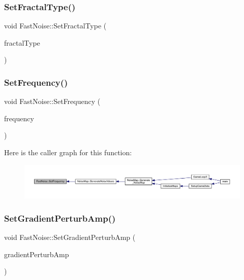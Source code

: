 \subsubsection{\texorpdfstring{Set\+Fractal\+Type()}{SetFractalType()}}
{\footnotesize\ttfamily void Fast\+Noise\+::\+Set\+Fractal\+Type (\begin{DoxyParamCaption}\item[{\mbox{\hyperlink{class_fast_noise_a20a2d45a468fa10a7c6a94e22c2f3d30}{Fractal\+Type}}}]{fractal\+Type }\end{DoxyParamCaption})\hspace{0.3cm}{\ttfamily [inline]}}

\mbox{\label{class_fast_noise_a4a16af07f18788c25e7515a9e1d2c53c}} 
\subsubsection{\texorpdfstring{Set\+Frequency()}{SetFrequency()}}
{\footnotesize\ttfamily void Fast\+Noise\+::\+Set\+Frequency (\begin{DoxyParamCaption}\item[{\mbox{\hyperlink{_fast_noise_8h_a75a9ef6d2541c4921815b885bfd449c3}{F\+N\+\_\+\+D\+E\+C\+I\+M\+AL}}}]{frequency }\end{DoxyParamCaption})\hspace{0.3cm}{\ttfamily [inline]}}

Here is the caller graph for this function\+:
\nopagebreak
\begin{figure}[H]
\begin{center}
\leavevmode
\includegraphics[width=350pt]{class_fast_noise_a4a16af07f18788c25e7515a9e1d2c53c_icgraph}
\end{center}
\end{figure}
\mbox{\label{class_fast_noise_a3b64dacf76e2a0f61769d51c73e9fdb3}} 
\subsubsection{\texorpdfstring{Set\+Gradient\+Perturb\+Amp()}{SetGradientPerturbAmp()}}
{\footnotesize\ttfamily void Fast\+Noise\+::\+Set\+Gradient\+Perturb\+Amp (\begin{DoxyParamCaption}\item[{\mbox{\hyperlink{_fast_noise_8h_a75a9ef6d2541c4921815b885bfd449c3}{F\+N\+\_\+\+D\+E\+C\+I\+M\+AL}}}]{gradient\+Perturb\+Amp }\end{DoxyParamCaption})\hspace{0.3cm}{\ttfamily [inline]}}


